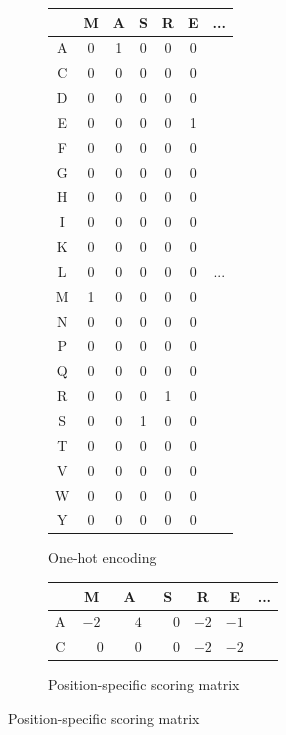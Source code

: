 \documentclass{l4proj}
\begin{document}
\begin{figure}
    \centering
    \begin{subfigure}[h]{0.45\textwidth}
        \centering
        \caption{One-hot encoding}
        \label{fig:feat1}
        \begin{tabular}{|c|cccccc|}
        \hline
          & M & A & S & R & E & ...\\ \hline
        A & 0 & 1 & 0 & 0 & 0 & \\ 
        C & 0 & 0 & 0 & 0 & 0 & \\ 
        D & 0 & 0 & 0 & 0 & 0 & \\ 
        E & 0 & 0 & 0 & 0 & 1 & \\ 
        F & 0 & 0 & 0 & 0 & 0 & \\ 
        G & 0 & 0 & 0 & 0 & 0 & \\ 
        H & 0 & 0 & 0 & 0 & 0 & \\ 
        I & 0 & 0 & 0 & 0 & 0 & \\ 
        K & 0 & 0 & 0 & 0 & 0 & \\ 
        L & 0 & 0 & 0 & 0 & 0 & ...\\ 
        M & 1 & 0 & 0 & 0 & 0 & \\ 
        N & 0 & 0 & 0 & 0 & 0 & \\ 
        P & 0 & 0 & 0 & 0 & 0 & \\ 
        Q & 0 & 0 & 0 & 0 & 0 & \\ 
        R & 0 & 0 & 0 & 1 & 0 & \\ 
        S & 0 & 0 & 1 & 0 & 0 & \\ 
        T & 0 & 0 & 0 & 0 & 0 & \\ 
        V & 0 & 0 & 0 & 0 & 0 & \\ 
        W & 0 & 0 & 0 & 0 & 0 & \\ 
        Y & 0 & 0 & 0 & 0 & 0 & \\ \hline
        \end{tabular}
    \end{subfigure}
    \begin{subfigure}[h]{0.45\textwidth}
        \centering
        \caption{Position-specific scoring matrix}
        \label{fig:feat2}
        \begin{tabular}{|c|cccccc|}
        \hline
        & M & A & S & R & E & ...\\ \hline
        A & $-2$ & $\phantom{-}4$ & $\phantom{-}0$ & $-2$ & $-1$ & \\
        C & $\phantom{-}0$ & $\phantom{-}0$ & $\phantom{-}0$ & $-2$ & $-2$ & \\

\end{tabular}
\end{subfigure}
\end{figure}
\end{document}
